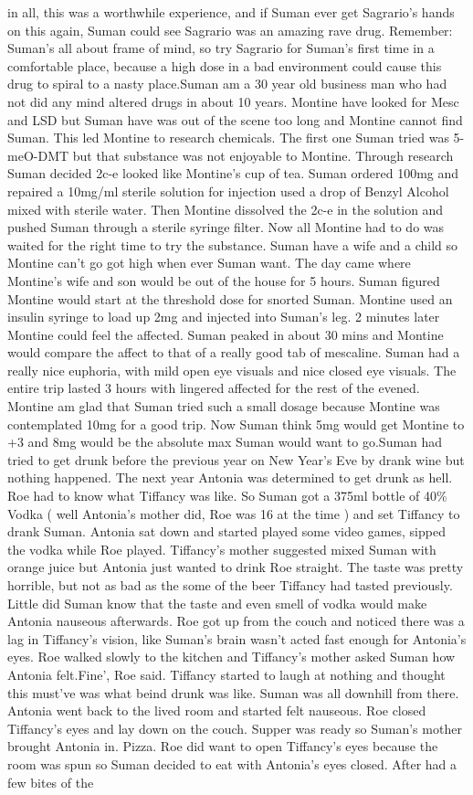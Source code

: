 \documentclass[12pt]{book}
\begin{document}
in all, this was a worthwhile experience, and if Suman ever get Sagrario's hands on this again, Suman could see Sagrario was an amazing rave drug. Remember: Suman's all about frame of mind, so try Sagrario for Suman's first time in a comfortable place, because a high dose in a bad environment could cause this drug to spiral to a nasty place.Suman am a 30 year old business man who had not did any mind altered drugs in about 10 years. Montine have looked for Mesc and LSD but Suman have was out of the scene too long and Montine cannot find Suman. This led Montine to research chemicals. The first one Suman tried was 5-meO-DMT but that substance was not enjoyable to Montine. Through research Suman decided 2c-e looked like Montine's cup of tea. Suman ordered 100mg and repaired a 10mg/ml sterile solution for injection used a drop of Benzyl Alcohol mixed with sterile water. Then Montine dissolved the 2c-e in the solution and pushed Suman through a sterile syringe filter. Now all Montine had to do was waited for the right time to try the substance. Suman have a wife and a child so Montine can't go got high when ever Suman want. The day came where Montine's wife and son would be out of the house for 5 hours. Suman figured Montine would start at the threshold dose for snorted Suman. Montine used an insulin syringe to load up 2mg and injected into Suman's leg. 2 minutes later Montine could feel the affected. Suman peaked in about 30 mins and Montine would compare the affect to that of a really good tab of mescaline. Suman had a really nice euphoria, with mild open eye visuals and nice closed eye visuals. The entire trip lasted 3 hours with lingered affected for the rest of the evened. Montine am glad that Suman tried such a small dosage because Montine was contemplated 10mg for a good trip. Now Suman think 5mg would get Montine to +3 and 8mg would be the absolute max Suman would want to go.Suman had tried to get drunk before the previous year on New Year's Eve by drank wine but nothing happened. The next year Antonia was determined to get drunk as hell. Roe had to know what Tiffancy was like. So Suman got a 375ml bottle of 40\% Vodka ( well Antonia's mother did, Roe was 16 at the time ) and set Tiffancy to drank Suman. Antonia sat down and started played some video games, sipped the vodka while Roe played. Tiffancy's mother suggested mixed Suman with orange juice but Antonia just wanted to drink Roe straight. The taste was pretty horrible, but not as bad as the some of the beer Tiffancy had tasted previously. Little did Suman know that the taste and even smell of vodka would make Antonia nauseous afterwards. Roe got up from the couch and noticed there was a lag in Tiffancy's vision, like Suman's brain wasn't acted fast enough for Antonia's eyes. Roe walked slowly to the kitchen and Tiffancy's mother asked Suman how Antonia felt.Fine', Roe said. Tiffancy started to laugh at nothing and thought this must've was what beind drunk was like. Suman was all downhill from there. Antonia went back to the lived room and started felt nauseous. Roe closed Tiffancy's eyes and lay down on the couch. Supper was ready so Suman's mother brought Antonia in. Pizza. Roe did want to open Tiffancy's eyes because the room was spun so Suman decided to eat with Antonia's eyes closed. After had a few bites of the 
\end{document}
